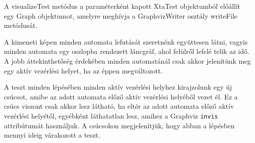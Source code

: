 A \textsf{visualizeTest} metódus a paraméterként kapott \textsf{XtaTest} objektumból előállít egy \textsf{Graph} objektumot, amelyre meghívja a \textsf{GraphvizWriter} osztály \textsf{writeFile} metódusát.

A kimeneti képen minden automata lefutását szeretnénk együttesen látni, vagyis minden automata egy oszlopba rendezett láncgráf, ahol felülről lefelé telik az idő. A jobb áttekinthetőség érdekében minden automatánál csak akkor jelenítünk meg egy aktív vezérlési helyet, ha az éppen megváltozott.

A teszt minden lépésében minden aktív vezérlési helyhez kirajzolunk egy új csúcsot, amibe az adott automata előző aktív vezérlési helyéből vezet él. Ez a csúcs viszont csak akkor lesz látható, ha eltér az adott automata előző aktív vezérlési helyétől, egyébként láthatatlan lesz, amihez a Graphviz \texttt{invis} attribútumát használjuk. A csúcsokon megjelenítjük, hogy abban a lépésben mennyi ideig várakozott a teszt.